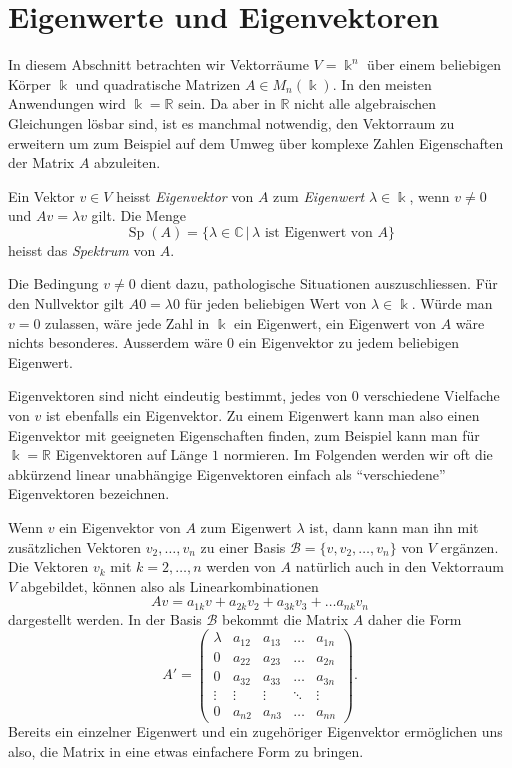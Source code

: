 %
%
%
\section{Eigenwerte und Eigenvektoren
\label{buch:section:eigenwerte-und-eigenvektoren}}
In diesem Abschnitt betrachten wir Vektorräume $V=\Bbbk^n$ über einem
beliebigen Körper $\Bbbk$ und quadratische Matrizen
$A\in M_n(\Bbbk)$.
In den meisten Anwendungen wird $\Bbbk=\mathbb{R}$ sein.
Da aber in $\mathbb{R}$ nicht alle algebraischen Gleichungen lösbar sind,
ist es manchmal notwendig, den Vektorraum zu erweitern um zum Beispiel
auf dem Umweg über komplexe Zahlen
Eigenschaften der Matrix $A$ abzuleiten.

\begin{definition}
\label{buch:eigenwerte:def:evew}
\label{buch:eigenwerte:def:spektrum}
Ein Vektor $v\in V$ heisst {\em Eigenvektor} von $A$ zum {\em Eigenwert}
%
%
$\lambda\in\Bbbk$, wenn $v\ne 0$ und $Av=\lambda v$ gilt.
Die Menge
\[
\operatorname{Sp}(A)
=
\{\lambda\in\mathbb{C}\,|\, \text{$\lambda$ ist Eigenwert von $A$}\}
\]
heisst das {\em Spektrum} von $A$.
%
\end{definition}

Die Bedingung $v\ne 0$ dient dazu, pathologische Situationen auszuschliessen.
Für den Nullvektor gilt $A0=\lambda 0$ für jeden beliebigen Wert von
$\lambda\in\Bbbk$.
Würde man $v=0$ zulassen, wäre jede Zahl in $\Bbbk$ ein Eigenwert,
ein Eigenwert von $A$ wäre nichts besonderes.
Ausserdem wäre $0$ ein Eigenvektor zu jedem beliebigen Eigenwert.

Eigenvektoren sind nicht eindeutig bestimmt, jedes von $0$ verschiedene
Vielfache von $v$ ist ebenfalls ein Eigenvektor.
Zu einem Eigenwert kann man also einen Eigenvektor mit 
geeigneten Eigenschaften finden, zum Beispiel kann man für $\Bbbk = \mathbb{R}$
Eigenvektoren auf Länge $1$ normieren.
Im Folgenden werden wir oft die abkürzend linear unabhängige Eigenvektoren
einfach als ``verschiedene'' Eigenvektoren bezeichnen.

Wenn $v$ ein Eigenvektor von $A$ zum Eigenwert $\lambda$ ist, dann kann
man ihn mit zusätzlichen Vektoren $v_2,\dots,v_n$ zu einer Basis
$\mathcal{B}=\{v,v_2,\dots,v_n\}$
von $V$ ergänzen.
Die Vektoren $v_k$ mit $k=2,\dots,n$ werden von $A$ natürlich auch
in den Vektorraum $V$ abgebildet, können also als Linearkombinationen
\[
Av = a_{1k}v + a_{2k}v_2 + a_{3k}v_3 + \dots a_{nk}v_n
\]
dargestellt werden.
In der Basis $\mathcal{B}$ bekommt die Matrix $A$ daher die Form
\[
A'
=
\begin{pmatrix}
\lambda&a_{12}&a_{13}&\dots &a_{1n}\\
    0  &a_{22}&a_{23}&\dots &a_{2n}\\
    0  &a_{32}&a_{33}&\dots &a_{3n}\\
\vdots &\vdots&\vdots&\ddots&\vdots\\
    0  &a_{n2}&a_{n3}&\dots &a_{nn}
\end{pmatrix}.
\]
Bereits ein einzelner Eigenwert und ein zugehöriger Eigenvektor
ermöglichen uns also, die Matrix in eine etwas einfachere Form
zu bringen.

